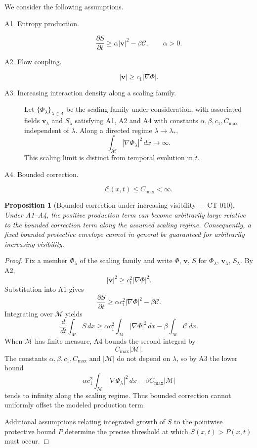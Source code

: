 \documentclass[11pt]{article}
\newtheorem{proposition}[theorem]{Proposition}
\theoremstyle{definition}
\theoremstyle{remark}
\newcommand{\manifold}{\mathcal{M}}
\begin{document}
We consider the following assumptions.

\begin{description}
  \item[A1. Entropy production.]
  \[
    \frac{\partial S}{\partial t}
    \geq
    \alpha|\mathbf{v}|^2
    -
    \beta\mathcal{C},
    \qquad
    \alpha>0.
  \]

  \item[A2. Flow coupling.]
  \[
    |\mathbf{v}|
    \geq
    c_1|\nabla\Phi|.
  \]

  \item[A3. Increasing interaction density along a scaling family.]
  Let $\{\Phi_\lambda\}_{\lambda\in\Lambda}$ be the scaling family under
  consideration, with associated fields $\mathbf{v}_\lambda$ and $S_\lambda$
  satisfying A1, A2 and A4 with constants $\alpha,\beta,c_1,C_{\max}$
  independent of $\lambda$. Along a directed regime $\lambda\to\lambda_*$,
  \[
    \int_{\manifold}|\nabla\Phi_\lambda|^2\,dx
    \longrightarrow\infty.
  \]
  This scaling limit is distinct from temporal evolution in $t$.

  \item[A4. Bounded correction.]
  \[
    \mathcal{C}(x,t)
    \leq
    C_{\max}<\infty.
  \]
\end{description}

\begin{proposition}[Bounded correction under increasing visibility --- CT-010]
Under A1--A4, the positive production term can become arbitrarily large
relative to the bounded correction term along the assumed scaling regime.
Consequently, a fixed bounded protective envelope cannot in general be
guaranteed for arbitrarily increasing visibility.
\end{proposition}

\begin{proof}
Fix a member $\Phi_\lambda$ of the scaling family and write $\Phi$,
$\mathbf{v}$, $S$ for $\Phi_\lambda$, $\mathbf{v}_\lambda$, $S_\lambda$. By A2,
\[
  |\mathbf{v}|^2
  \geq
  c_1^2|\nabla\Phi|^2.
\]
Substitution into A1 gives
\[
  \frac{\partial S}{\partial t}
  \geq
  \alpha c_1^2|\nabla\Phi|^2
  -
  \beta\mathcal{C}.
\]
Integrating over $\manifold$ yields
\[
  \frac{d}{dt}
  \int_{\manifold}S\,dx
  \geq
  \alpha c_1^2
  \int_{\manifold}|\nabla\Phi|^2\,dx
  -
  \beta
  \int_{\manifold}\mathcal{C}\,dx.
\]
When $\manifold$ has finite measure, A4 bounds the second integral by
\[
  C_{\max}|\manifold|.
\]
The constants $\alpha,\beta,c_1,C_{\max}$ and $|\manifold|$ do not depend on
$\lambda$, so by A3 the lower bound
\[
  \alpha c_1^2\int_{\manifold}|\nabla\Phi_\lambda|^2\,dx
  -\beta C_{\max}|\manifold|
\]
tends to infinity along the scaling regime. Thus bounded correction cannot
uniformly offset the modeled production term.

Additional assumptions relating integrated growth of $S$ to the pointwise
protective bound $P$ determine the precise threshold at which
$S(x,t)>P(x,t)$ must occur.
\end{proof}
\end{document}
